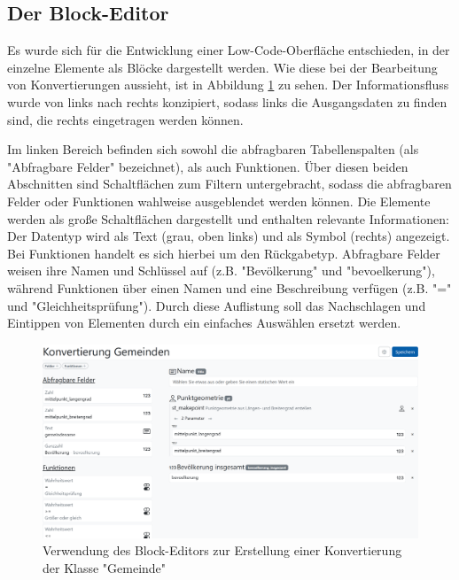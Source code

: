 \subsection{Der Block-Editor}

Es wurde sich für die Entwicklung einer Low-Code-Oberfläche entschieden, in der einzelne Elemente als Blöcke dargestellt werden. Wie diese bei der Bearbeitung von Konvertierungen aussieht, ist in Abbildung \ref{fig:buffet-simple} zu sehen. Der Informationsfluss wurde von links nach rechts konzipiert, sodass links die Ausgangsdaten zu finden sind, die rechts eingetragen werden können.

Im linken Bereich befinden sich sowohl die abfragbaren Tabellenspalten (als "Abfragbare Felder" bezeichnet), als auch Funktionen. Über diesen beiden Abschnitten sind Schaltflächen zum Filtern untergebracht, sodass die abfragbaren Felder oder Funktionen wahlweise ausgeblendet werden können. Die Elemente werden als große Schaltflächen dargestellt und enthalten relevante Informationen: Der Datentyp wird als Text (grau, oben links) und als Symbol (rechts) angezeigt. Bei Funktionen handelt es sich hierbei um den Rückgabetyp. Abfragbare Felder weisen ihre Namen und Schlüssel auf (z.B. "Bevölkerung" und "bevoelkerung"), während Funktionen über einen Namen und eine Beschreibung verfügen (z.B. "=" und "Gleichheitsprüfung"). Durch diese Auflistung soll das Nachschlagen und Eintippen von Elementen durch ein einfaches Auswählen ersetzt werden.

\begin{figure}[ht]
  \centering
  \includegraphics[width=.95\textwidth]{assets/buffet-simple.png}
  \caption{Verwendung des Block-Editors zur Erstellung einer Konvertierung der Klasse "Gemeinde"}
  \label{fig:buffet-simple}
\end{figure}

